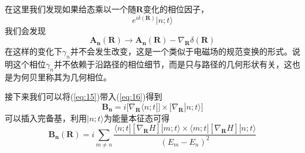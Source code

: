 \documentclass{article}
\begin{document}
在这里我们发现如果给态乘以一个随$ \boldsymbol{R} $变化的相位因子，
\begin{equation}
	e^{i\delta(\boldsymbol{R})}|n;t\rangle
\end{equation}
我们会发现
\begin{equation}
	\boldsymbol{A_n}(\boldsymbol{R})\rightarrow\boldsymbol{A_n}(\boldsymbol{R})-\nabla_{\boldsymbol{R}}\delta(\boldsymbol{R})
\end{equation}
在这样的变化下$\gamma_n$并不会发生改变，这是一个类似于电磁场的规范变换的形式。说明这个相位$\gamma_n$并不依赖于沿路径的相位细节，而是只与路径的几何形状有关，这也是为何贝里称其为几何相位。


接下来我们可以将(\ref{eq:15})带入(\ref{eq:16})得到
\begin{equation}
	\boldsymbol{B_n}=i\bigg[\nabla_{\boldsymbol{R}}\langle n;t|\bigg]\times\bigg[\nabla_{\boldsymbol{R}}|n;t\rangle\bigg]
\end{equation}
可以插入完备基，利用$ |n;t\rangle $为能量本征态可得
\begin{equation}
	\boldsymbol{B_n}(\boldsymbol{R})=i\sum_{m\neq n}\frac{\langle n;t|[\nabla_{\boldsymbol{R}}H]|m;t\rangle\times\langle m;t|[\nabla_{\boldsymbol{R}}H]|n;t\rangle}{(E_m-E_n)^2}
\end{equation}
\end{document}
